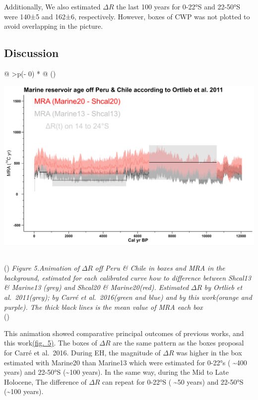 \documentclass[
]{article}
\begin{document}
Additionally, We also estimated \(\Delta R\) the last 100 years for
0-22°S and 22-50°S were 140±5 and 162±6, respectively. However, boxes of
CWP was not plotted to avoid overlapping in the picture.

\hypertarget{discussion}{%
\subsection{Discussion}\label{discussion}}

\begin{longtable}[]{@{}
  >{\centering\arraybackslash}p{(\columnwidth - 0\tabcolsep) * }@{}}
\toprule()
\begin{minipage}[b]{\linewidth}\centering
\href{https://github.com/jasb3110/Radiocarbon-reservoir/blob/8bddc9b0f2d8f839ca2d4826f47d9050d49384aa/animation.gif?raw=true}{\includegraphics{animation.gif?}}
\end{minipage} \\
\midrule()
\endhead
\emph{Figure 5.Animation of} \(\Delta R\) \emph{off Peru \& Chile in
boxes and MRA in the background, estimated for each calibrated curve how
to difference between Shcal13 \& Marine13 (grey) and Shcal20 \&
Marine20(red). Estimated} \(\Delta R\) \emph{by Ortlieb et
al.~2011(grey); by Carré et al.~2016(green and blue) and by this
work(orange and purple). The thick black lines is the mean value of MRA
each box} \\
\bottomrule()
\end{longtable}

This animation showed comparative principal outcomes of previous works,
and this work\protect\hyperlink{discussion}{(fig.~5)}. The boxes of
\(\Delta R\) are the same pattern as the boxes proposal for Carré et
al.~2016. During EH, the magnitude of \(\Delta R\) was higher in the box
estimated with Marine20 than Marine13 which were estimated for 0-22°s (
\textasciitilde400 years) and 22-50°S (\textasciitilde100 years). In the
same way, during the Mid to Late Holocene, The difference of
\(\Delta R\) can repeat for 0-22°S ( \textasciitilde50 years) and
22-50°S (\textasciitilde100 years).
\end{document}

